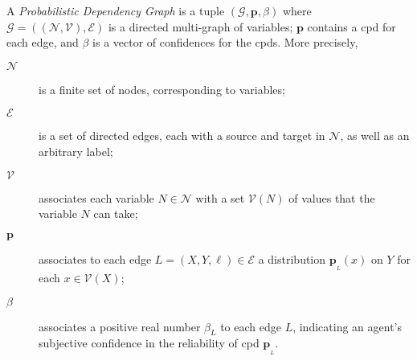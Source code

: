 \documentclass[letterpaper]{article} %
\theoremstyle{plain}
\theoremstyle{definition}
\theoremstyle{remark}
\newcommand{\notation}[1]{{\color{notationcolor} #1}}
\renewcommand{\notation}[1]{\ignorespaces} %
\newcommand{\valpha}[1]{{\color{red!80!black}#1}}
\newcommand\mat[1]{\mathbf{#1}}
\newcommand\Set{\mathbb{S}\mathrm{et}}
\newcommand{\bp}[1][L]{\mat{p}_{\!_{#1}\!}}
\newcommand{\V}{\mathcal V}
\newcommand{\N}{\mathcal N}
\newcommand{\Ed}{\mathcal E}
\newcommand{\Gr}{\mathcal G}
\newcommand{\nvvars}[1][\N,\V]{(#1)}
\begin{document}
	\setcounter{section}{2}
\begin{defn}
A \emph{Probabilistic Dependency Graph} is a tuple $(\Gr, \mat p, \beta)$ where $\Gr = (\nvvars, \Ed)$ is a directed multi-graph of variables; $\mat p$ contains a cpd for each edge, and $\beta$ is a vector of confidences for the cpds. More precisely,
	\begin{description}%

	\item[$\N$] \notation{$:\Set$}
	is a finite set of nodes, corresponding to variables;

	\item[$\Ed$] \notation{$ \subseteq \N \times \N \times \mathit{Label}$} %
	is a set of directed edges, each with a source and target in $\N$, as well as an arbitrary label;

	\item[$\V$] \notation{$\N \to \mathbf{Set}$}
	associates each variable $N \in \N$ with a set $\V(N)$ of values that the variable $N$ can take;

	\item[$\mat p$] \notation{$\colon \big(\!({A,B,\ell})\colon \! \Ed \big) \to \V(A) \to \Delta\V(B)$}

	associates to each edge $L = (X,Y,\ell) \in \Ed$ a distribution $\bp(x)$ on $Y$ for each $x \in \V(X)$; 
% 
	\item[$\beta$] \notation{$:\Ed \to \mathbb R^+$}
	associates a positive real number $\beta_L$ to each edge $L$, indicating an agent's subjective confidence in the reliability of cpd $\bp$. 
\end{description}


\end{defn}
\end{document}
